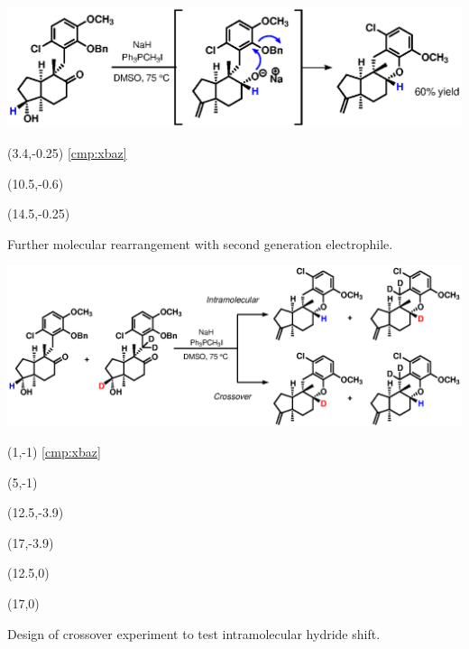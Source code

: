 \begin{Scheme}[t]
  \centering
  \includegraphics[scale=0.8]{chp_singlecarbon/images/hydridetwo}
  \begin{textblock}{1}(3.4,-0.25) \textsf{\scriptsize{\ref{cmp:xbaz}}} \end{textblock}
  \begin{textblock}{1}(10.5,-0.6)   \end{textblock}
  \begin{textblock}{1}(14.5,-0.25)   \end{textblock}
  \caption{Further molecular rearrangement with second generation electrophile.}
  \label{sch:hydridetwo}
\end{Scheme}
\begin{Scheme}[hb]
  \centering
  \includegraphics[scale=0.8]{chp_singlecarbon/images/crossover}
  \begin{textblock}{1}(1,-1) \textsf{\scriptsize{\ref{cmp:xbaz}}} \end{textblock}
  \begin{textblock}{1}(5,-1)   \end{textblock}
  \begin{textblock}{1}(12.5,-3.9)   \end{textblock}
  \begin{textblock}{1}(17,-3.9)   \end{textblock}
  \begin{textblock}{1}(12.5,0)   \end{textblock}
  \begin{textblock}{1}(17,0)   \end{textblock}
  \caption{Design of crossover experiment to test intramolecular hydride shift.}
  \label{sch:crossover}
\end{Scheme}


